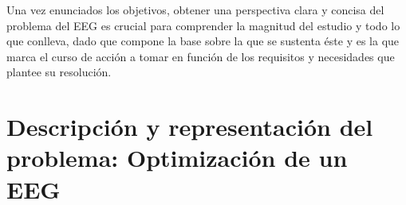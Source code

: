 Una vez enunciados los objetivos, obtener una perspectiva clara y concisa del problema del EEG es crucial para comprender la magnitud del estudio y todo lo que conlleva, dado que compone la base sobre la que se sustenta éste y es la que marca el curso de acción a tomar en función de los requisitos y necesidades que plantee su resolución. 

\section{Descripción y representación del problema: Optimización de un EEG}








